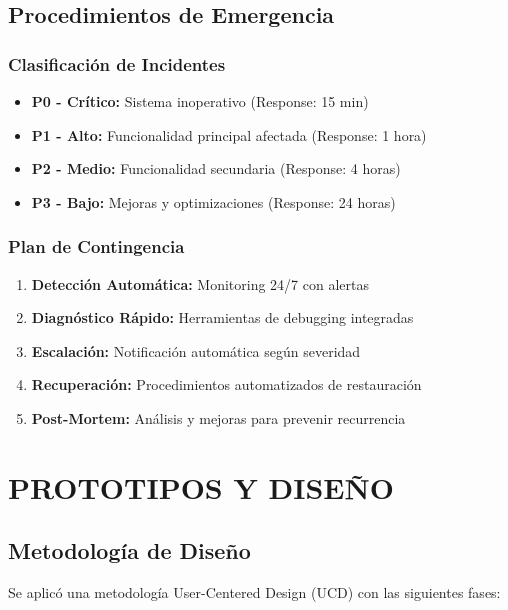 \documentclass[12pt,a4paper]{article}
\begin{document}
\subsection{Procedimientos de Emergencia}

\subsubsection{Clasificación de Incidentes}

\begin{itemize}
    \item \textbf{P0 - Crítico:} Sistema inoperativo (Response: 15 min)
    \item \textbf{P1 - Alto:} Funcionalidad principal afectada (Response: 1 hora)
    \item \textbf{P2 - Medio:} Funcionalidad secundaria (Response: 4 horas)
    \item \textbf{P3 - Bajo:} Mejoras y optimizaciones (Response: 24 horas)
\end{itemize}

\subsubsection{Plan de Contingencia}

\begin{enumerate}
    \item \textbf{Detección Automática:} Monitoring 24/7 con alertas
    \item \textbf{Diagnóstico Rápido:} Herramientas de debugging integradas
    \item \textbf{Escalación:} Notificación automática según severidad
    \item \textbf{Recuperación:} Procedimientos automatizados de restauración
    \item \textbf{Post-Mortem:} Análisis y mejoras para prevenir recurrencia
\end{enumerate}

\section{PROTOTIPOS Y DISEÑO}

\subsection{Metodología de Diseño}

Se aplicó una metodología User-Centered Design (UCD) con las siguientes fases:
\end{document}
